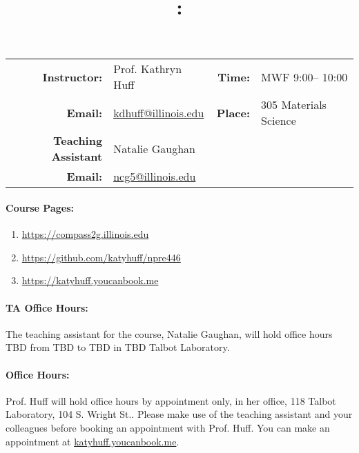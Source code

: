 \documentclass[11pt]{article}
\title{\CourseNumber: \CourseTitle\\}
\author{\CourseUniversity}
\date{\CourseSemester \CourseYear}
\makeatletter
\newcommand{\CourseInstructor}{Prof. Kathryn Huff\xspace}%
\newcommand{\CourseDays}{MWF\xspace}%
\newcommand{\CourseStart}{9:00\xspace}%
\newcommand{\CourseEnd}{10:00\xspace}%
\newcommand{\CourseInstructorEmail}{kdhuff@illinois.edu}
\newcommand{\CourseRoom}{305\xspace}%
\newcommand{\CourseBuilding}{Materials Science\xspace}%
\newcommand{\TeachingAssistant}{Natalie Gaughan\xspace}%
\newcommand{\TAOfficeHourDays}{TBD\xspace}%
\newcommand{\TAEmail}{ncg5@illinois.edu}%
\newcommand{\TAOfficeHourStart}{TBD\xspace}%
\newcommand{\TAOfficeHourEnd}{TBD\xspace}%
\newcommand{\TAOfficeHourPlace}{TBD Talbot Laboratory\xspace}
\newcommand{\HuffOfficeHourPlace}{118 Talbot Laboratory, 104 S. Wright St.\xspace}
\makeatother
\begin{document}
\maketitle
\renewcommand{\arraystretch}{1.5}
\begin{center}
\begin{table}[h]
\begin{tabularx}{\textwidth}{rXrX}
\hline
\textbf{Instructor:} & \CourseInstructor & \textbf{Time:} & \CourseDays \CourseStart -- \CourseEnd \\
\textbf{Email:} &  \href{mailto:\CourseInstructorEmail}{\CourseInstructorEmail} & \textbf{Place:} & \CourseRoom \CourseBuilding\\
\textbf{Teaching Assistant} & \TeachingAssistant & & \\
\textbf{Email:} &  \href{mailto:\TAEmail}{\TAEmail} & & \\
\hline
\end{tabularx}
\end{table}
\end{center}

\paragraph{Course Pages:}
\begin{enumerate}
        \item \url{https://compass2g.illinois.edu}
        \item \url{https://github.com/katyhuff/npre446}
        \item \url{https://katyhuff.youcanbook.me}
\end{enumerate}

\paragraph{TA Office Hours:} The teaching assistant for the course, 
\TeachingAssistant, will hold office hours \TAOfficeHourDays from 
\TAOfficeHourStart to \TAOfficeHourEnd in \TAOfficeHourPlace.

\paragraph{Office Hours:} Prof. Huff will hold office hours by appointment 
only, in her office, \HuffOfficeHourPlace. Please make use of the teaching 
assistant and your colleagues before booking an appointment with Prof. Huff. 
You can make  an appointment at \url{katyhuff.youcanbook.me}.
\end{document}
